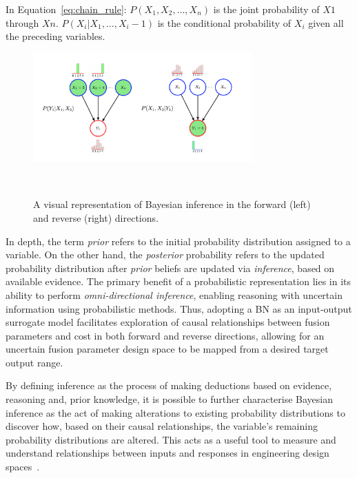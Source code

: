 \documentclass[journal]{IEEEtran}
\begin{document}
In Equation~\ref{eq:chain_rule}: $P(X_1, X_2, \ldots, X_n)$ is the joint probability of $X1$ through $Xn$. $P(X_i | X_1, \ldots, X_i-1)$ is the conditional probability of $X_i$ given all the preceding variables.

\begin{figure}[t]
    \centering
    \includegraphics[width=0.75\textwidth]{figures/methodology/inference_F&R_diagram.png}
    \caption{A visual representation of Bayesian inference in the forward (left) and reverse (right) directions.}~\label{fig:inference_F&R_diagram}
\end{figure}

In depth, the term \textit{prior} refers to the initial probability distribution assigned to a variable. On the other hand, the \textit{posterior} probability refers to the updated probability distribution after \textit{prior} beliefs are updated via \textit{inference}, based on available evidence. The primary benefit of a probabilistic representation lies in its ability to perform \textit{omni-directional inference}, enabling reasoning with uncertain information using probabilistic methods. Thus, adopting a BN as an input-output surrogate model facilitates exploration of causal relationships between fusion parameters and cost in both forward and reverse directions, allowing for an uncertain fusion parameter design space to be mapped from a desired target output range. 

By defining inference as the process of making deductions based on evidence, reasoning and, prior knowledge, it is possible to further characterise Bayesian inference as the act of making alterations to existing probability distributions to discover how, based on their causal relationships, the variable's remaining probability distributions are altered. This acts as a useful tool to measure and understand relationships between inputs and responses in engineering design spaces~\cite{Koller2009}. 
\end{document}
